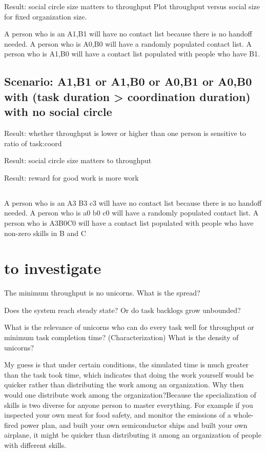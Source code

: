 Result: social circle size matters to throughput 
Plot throughput versus social size for fixed organization size.

A person who is an A1,B1 will have no contact list because there is no handoff needed. A person who is A0,B0 will have a randomly populated contact list. A person who is A1,B0 will have a contact list populated with people who have B1.




\subsection*{Scenario: A1,B1 or A1,B0 or A0,B1 or A0,B0\\with (task duration > coordination duration)\\with no social circle}

Result: whether throughput is lower or higher than one person is sensitive to ratio of task:coord

Result: social circle size matters to throughput 

Result: reward for good work is more work 

\subsection*{}

A person who is an A3 B3 c3 will have no contact list because there is no handoff needed. A person who is a0 b0 c0 will have a randomly populated contact list. A person who is A3B0C0 will have a contact list populated with people who have non-zero skills in B and C

\section{to investigate}

The minimum throughput is no unicorns. What is the spread?

Does the system reach steady state? 
Or do task backlogs grow unbounded?

What is the relevance of unicorns who can do every task well for throughput or minimum task completion time?
(Characterization) What is the density of unicorns?



My guess is that under certain conditions, the simulated time is much greater than the task took time, which indicates that doing the work yourself would be quicker rather than distributing the work among an organization.
Why then would one distribute work among the organization?Because the specialization of skills is two diverse for anyone person to master everything. For example if you inspected your own meat for food safety, and monitor the emissions of a whole-fired power plan, and built your own semiconductor ships and built your own airplane, it might be quicker than distributing it among an organization of people with different skills.


